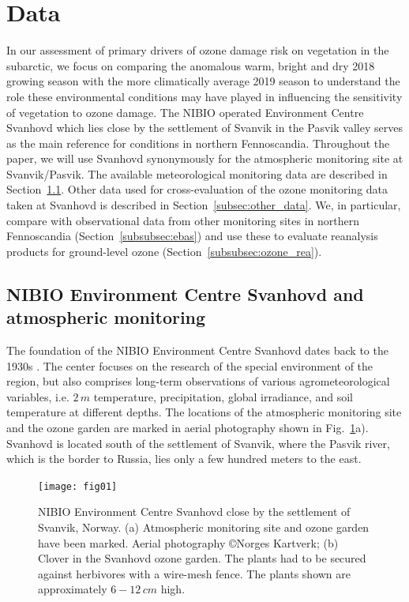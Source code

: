 \documentclass[bg, manuscript]{copernicus}
\begin{document}
\section{Data}
\label{sec:data}

In our assessment of primary drivers of ozone damage risk on vegetation in the subarctic, we focus on comparing the anomalous warm, bright and dry 2018 growing season with the more climatically average 2019 season to understand the role these environmental conditions may have played in influencing the sensitivity of vegetation to ozone damage. The NIBIO operated Environment Centre Svanhovd which lies close by the settlement of Svanvik in the Pasvik valley serves as the main reference for conditions in northern Fennoscandia. Throughout the paper, we will use Svanhovd synonymously for the atmospheric monitoring site at Svanvik/Pasvik. The available meteorological monitoring data are described in Section~\ref{subsec:atmo_svanvik}. Other data used for cross-evaluation of the ozone monitoring data taken at Svanhovd is described in Section~\ref{subsec:other_data}. We, in particular, compare with observational data from other monitoring sites in northern Fennoscandia (Section~\ref{subsubsec:ebas}) and use these to evaluate reanalysis products for ground-level ozone (Section~\ref{subsubsec:ozone_rea}).

\subsection{NIBIO Environment Centre Svanhovd and atmospheric monitoring}
\label{subsec:atmo_svanvik}
The foundation of the NIBIO Environment Centre Svanhovd dates back to the 1930s \citep{NIBIO_Svanhovd}. The center focuses on the research of the special environment of the region, but also comprises long-term observations of various agrometeorological variables, i.e. $2\,\unit{m}$ temperature, precipitation, global irradiance, and soil temperature at different depths. The locations of the atmospheric monitoring site and the ozone garden are marked in aerial photography shown in Fig.~\ref{fig:svanhovd_research_station}a). Svanhovd is located south of the settlement of Svanvik, where the Pasvik river, which is the border to Russia, lies only a few hundred meters to the east.\\

\begin{figure}[t]
  \texttt{[image: fig01]}
  \caption{NIBIO Environment Centre Svanhovd close by the settlement of Svanvik, Norway. (a) Atmospheric monitoring site and ozone garden have been marked. Aerial photography \copyright Norges Kartverk; (b) Clover in the Svanhovd ozone garden. The plants had to be secured against herbivores with a wire-mesh fence. The plants shown are approximately $6-12\,\unit{cm}$ high.}
  \label{fig:svanhovd_research_station}
\end{figure}
\end{document}
